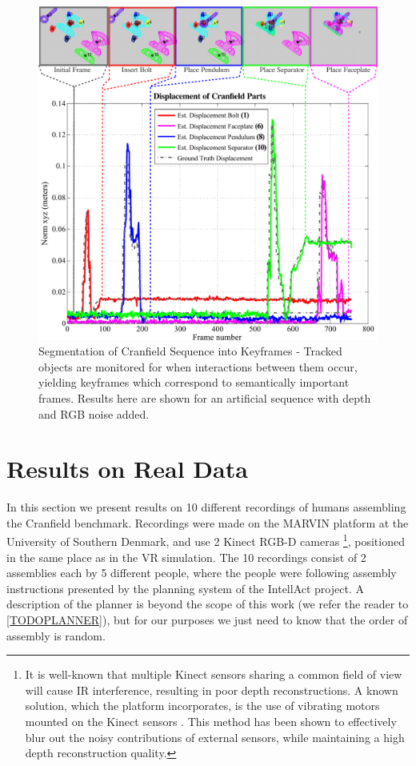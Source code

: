 \begin{figure}[!ht]
  \centering
  \includegraphics[width=\linewidth]{figures/Tracking/Action_Segmentation.pdf}
  \caption[Segmentation of Actions]{Segmentation of Cranfield Sequence into Keyframes - Tracked objects are monitored for when interactions between them occur, yielding keyframes which correspond to semantically important frames. Results here are shown for an artificial sequence with depth and RGB noise added.}
  \label{fig:ActionSegmentation}
\end{figure}

\section{Results on Real Data}
In this section we present results on 10 different recordings of humans assembling the Cranfield benchmark. Recordings were made on the MARVIN platform at the University of Southern Denmark, and use 2 Kinect RGB-D cameras \footnote{It is well-known that multiple Kinect sensors sharing a common field of view will cause IR interference, resulting in poor depth reconstructions. A known solution, which the platform incorporates, is the use of vibrating motors mounted on the Kinect sensors \cite{Butler2012}. This method has been shown to effectively blur out the noisy contributions of external sensors, while maintaining a high depth reconstruction quality.}, positioned in the same place as in the VR simulation. The 10 recordings consist of 2 assemblies each by 5 different people, where the people were following assembly instructions presented by the planning system of the IntellAct project. A description of the planner is beyond the scope of this work (we refer the reader to \ref{TODOPLANNER}), but for our purposes we just need to know that the order of assembly is random. 

